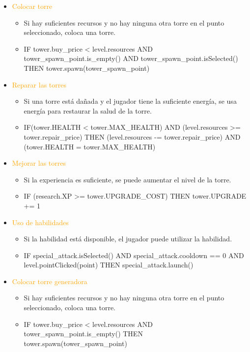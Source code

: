 \documentclass{article}
\begin{document}
\begin{itemize}
    \item \textcolor{Orange}{Colocar torre}
    \begin{itemize}
        \item Si hay suficientes recursos y no hay ninguna otra torre en el punto seleccionado, coloca una torre.
        \item IF tower.buy\_price < level.resources AND tower\_spawn\_point.is\_empty() AND \break tower\_spawn\_point.isSelected() THEN tower.spawn(tower\_spawn\_point)
    \end{itemize}
    \item \textcolor{Orange}{Reparar las torres}
    \begin{itemize}
        \item Si una torre está dañada y el jugador tiene la suficiente energía, se usa energía para restaurar la salud de la torre.
        \item IF(tower.HEALTH < tower.MAX\_HEALTH) AND (level.resources >= tower.repair\_price) THEN (level.resources -= tower.repair\_price)  AND (tower.HEALTH = tower.MAX\_HEALTH)
    \end{itemize}
    \item \textcolor{Orange}{Mejorar las torres}
    \begin{itemize}
        \item Si la experiencia es suficiente, se puede aumentar el nivel de la torre.
        \item IF (research.XP  >= tower.UPGRADE\_COST) THEN tower.UPGRADE += 1
    \end{itemize}
    \item \textcolor{Orange}{Uso de habilidades}
    \begin{itemize}
        \item Si la habilidad está disponible, el jugador puede utilizar la habilidad.
        \item IF special\_attack.isSelected() AND special\_attack.cooldown == 0 AND \break level.pointClicked(point) THEN special\_attack.launch()
    \end{itemize}
    \item \textcolor{Orange}{Colocar torre generadora}
    \begin{itemize}
        \item Si hay suficientes recursos y no hay ninguna otra torre en el punto seleccionado, coloca una torre.
        \item IF tower.buy\_price < level.resources AND tower\_spawn\_point.is\_empty() THEN \break tower.spawn(tower\_spawn\_point)

\end{itemize}
\end{itemize}
\end{document}
